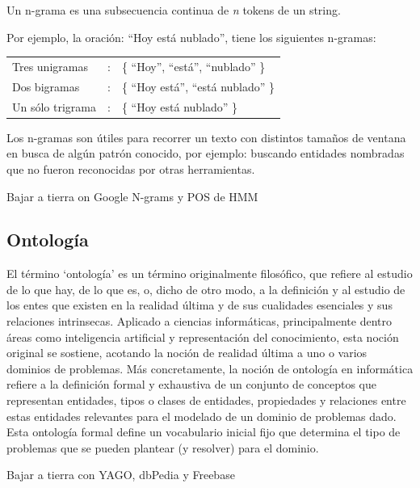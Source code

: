 Un n-grama es una subsecuencia continua de \textit{n} tokens de un string.

Por ejemplo, la oración: {\textquotedblleft}Hoy está nublado{\textquotedblright}, tiene los siguientes n-gramas:
\medskip

\begin{tabular}{lll}
Tres unigramas & : & \{ {\textquotedblleft}Hoy{\textquotedblright}, {\textquotedblleft}está{\textquotedblright}, {\textquotedblleft}nublado{\textquotedblright} \} \\
Dos bigramas & : & \{ {\textquotedblleft}Hoy está{\textquotedblright}, {\textquotedblleft}está nublado{\textquotedblright} \} \\
Un sólo trigrama & : & \{ {\textquotedblleft}Hoy está nublado{\textquotedblright} \}\\
\end{tabular}
\medskip

Los n-gramas son útiles para recorrer un
texto con distintos tama\~nos de ventana en busca de algún patrón
conocido, por ejemplo: buscando entidades nombradas que no fueron reconocidas por otras herramientas.

{\color{red} Bajar a tierra on Google N-grams y POS de HMM}

\subsection*{Ontología}

El término `ontología' es un término originalmente filosófico, que refiere al estudio de lo que hay, de lo que es, o, dicho de otro modo, a la definición y al estudio de los entes que existen en la realidad última y de sus cualidades esenciales y sus relaciones intrinsecas. Aplicado a ciencias informáticas, principalmente dentro áreas como inteligencia artificial y representación del conocimiento, esta noción original se sostiene, acotando la noción de realidad última a uno o varios dominios de problemas. Más concretamente, la noción de ontología en informática refiere a la definición formal y exhaustiva de un conjunto de conceptos que representan entidades, tipos o clases de entidades, propiedades y relaciones entre estas entidades relevantes para el modelado de un dominio de problemas dado. Esta ontología formal define un vocabulario inicial fijo que determina el tipo de problemas que se pueden plantear (y resolver) para el dominio.

{\color{red} Bajar a tierra con YAGO, dbPedia y Freebase}

